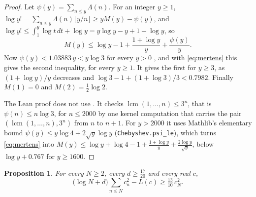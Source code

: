 \documentclass[11pt]{article}
\newtheorem{proposition}[theorem]{Proposition}
\theoremstyle{definition}
\newcommand{\lean}[1]{\texttt{#1}}
\begin{document}
\begin{proof}
Let $\psi(y) = \sum_{n \le y} \Lambda(n)$. For an integer $y \ge 1$, $\log y! = \sum_{n \le y} \Lambda(n) \lfloor y/n
\rfloor \ge y M(y) - \psi(y)$, and $\log y! \le \int_1^y \log t\,dt + \log y = y \log y - y + 1 + \log y$, so
\begin{equation}\label{eq:mertens}
M(y) \le \log y - 1 + \frac{1 + \log y}{y} + \frac{\psi(y)}{y}.
\end{equation}
Now $\psi(y) < 1.03883\,y < y \log 3$ for every $y > 0$ \cite[Theorem~12]{rosser-schoenfeld}, and with
\eqref{eq:mertens} this gives the second inequality, for every $y \ge 1$. It gives the first for $y \ge 3$, as $(1 +
\log y)/y$ decreases and $\log 3 - 1 + (1 + \log 3)/3 < 0.7982$. Finally $M(1) = 0$ and $M(2) = \frac12 \log 2$.

The Lean proof does not use \cite{rosser-schoenfeld}. It checks $\operatorname{lcm}(1, \dots, n) \le 3^n$, that is
$\psi(n) \le n \log 3$, for $n \le 2000$ by one kernel computation that carries the pair $(\operatorname{lcm}(1, \dots,
n), 3^n)$ from $n$ to $n + 1$. For $y > 2000$ it uses Mathlib's
elementary bound $\psi(y) \le y \log 4 + 2\sqrt y \log y$
(\lean{Chebyshev.psi\_le}), which
turns \eqref{eq:mertens} into $M(y) \le \log y + \log 4 - 1 + \frac{1 + \log y}{y} + \frac{2 \log y}{\sqrt y}$, below
$\log y + 0.767$ for $y \ge 1600$.
\end{proof}

\begin{proposition}\label{prop:top}
For every $N \ge 2$, every $d \ge \frac{17}{20}$ and every real $c$,
\[
\big(\log N + d\big) \sum_{n \le N} c_n^2 - L(c) \ge \tfrac{13}{10}\, c_N^2 .
\]
\end{proposition}
\end{document}
